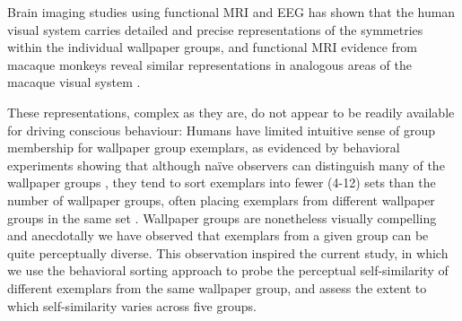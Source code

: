 \documentclass[11pt, twoside]{article}
\begin{document}
Brain imaging studies using functional MRI \citep{RN1725} and EEG \citep{RN1959,kohler_clarke_2021} has shown that the human visual system carries detailed and precise representations of the symmetries within the individual wallpaper groups, and functional MRI evidence from macaque monkeys reveal similar representations in analogous areas of the macaque visual system \citep{audurier_symmetry_2021}.

These representations, complex as they are, do not appear to be readily available for driving conscious behaviour: Humans have limited intuitive sense of group membership for wallpaper group exemplars, as evidenced by behavioral experiments showing that although naïve observers can distinguish many of the wallpaper groups \citep{RN1253}, they tend to sort exemplars into fewer (4-12) sets than the number of wallpaper groups, often placing exemplars from different wallpaper groups in the same set \citep{RN172}. Wallpaper groups are nonetheless visually compelling and anecdotally we have observed that exemplars from a given group can be quite perceptually diverse. This observation inspired the current study, in which we use the behavioral sorting approach to probe the perceptual self-similarity of different exemplars from the same wallpaper group, and assess the extent to which self-similarity varies across five groups. 
\end{document}
